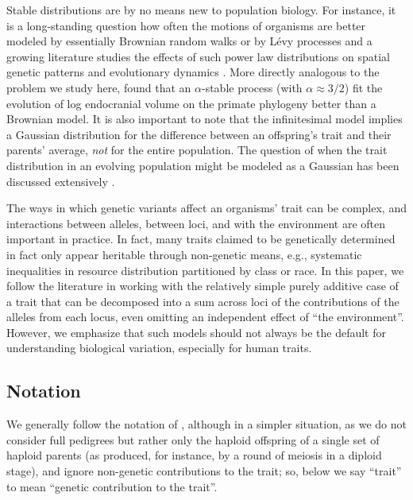 \documentclass{article}
\newcommand{\1}{\mathbbm{1}}
\theoremstyle{remark}
\theoremstyle{definition}
\begin{document}
Stable distributions are by no means new to population biology.
For instance, it is a long-standing question how often the motions of organisms
are better modeled by essentially Brownian random walks or by L\'evy processes \citep{benhamou2007animals}
and a growing literature studies the effects of such power law distributions
on spatial genetic patterns and evolutionary dynamics
\citep[e.g.,][]{paulose2019spatial,smith2023isolation}.
More directly analogous to the problem we study here, \citet{landis2012phylogenetic}
found that an $\alpha$-stable process (with $\alpha \approx 3/2$) fit the evolution of log endocranial volume
on the primate phylogeny
better than a Brownian model.
It is also important to note that
the infinitesimal model implies a Gaussian distribution for the difference between an offspring's trait and their parents' average,
\emph{not} for the entire population.
The question of when the trait distribution in an evolving population
might be modeled as a Gaussian has been discussed extensively
\citep[e.g.,][]{turelli1994genetic,dbarre2015evolution}.

The ways in which genetic variants affect an organisms' trait can be complex,
and interactions between alleles, between loci, and with the environment are often important in practice.
In fact, many traits claimed to be genetically determined 
in fact only appear heritable through non-genetic means,
e.g., systematic inequalities in resource distribution partitioned by class or race.
In this paper, we follow the literature in working with the relatively simple purely additive case
of a trait that can be decomposed into a sum across loci of the contributions of the alleles from each locus,
even omitting an independent effect of ``the environment''.
However, we emphasize that such models should not always be the default for understanding biological variation,
especially for human traits.

\subsection*{Notation}

We generally follow the notation of \citet{barton2017infinitesimal},
although in a simpler situation,
as we do not consider full pedigrees
but rather only the haploid offspring of a single set of haploid parents
(as produced, for instance, by a round of meiosis in a diploid stage),
and ignore non-genetic contributions to the trait;
so, below we say ``trait'' to mean ``genetic contribution to the trait''.
\end{document}
